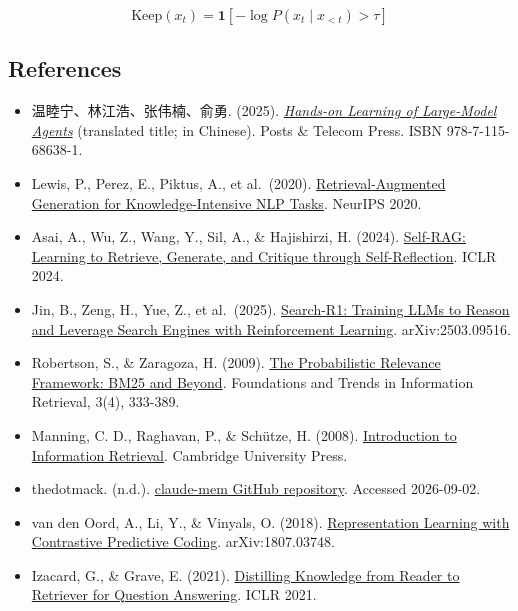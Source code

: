 \[
\mathrm{Keep}(x_t)=\mathbf{1}\!\left[-\log P\!\left(x_t\mid x_{<t}\right)>\tau\right]
\]

\FloatBarrier
{}
\hypertarget{references-125}{%
\subsection{References}\label{references-125}}

\vspace{0.25em}
\begin{itemize}
\tightlist
\item
  温睦宁、林江浩、张伟楠、俞勇. (2025). \href{https://haa.boyuai.com/}{\emph{Hands-on Learning of Large-Model Agents}} (translated title; in Chinese). Posts \& Telecom Press. ISBN 978-7-115-68638-1.
\item
  Lewis, P., Perez, E., Piktus, A., et al.~(2020). \href{https://proceedings.neurips.cc/paper/2020/hash/6b493230-Abstract.html}{Retrieval-Augmented Generation for Knowledge-Intensive NLP Tasks}. NeurIPS 2020.
\item
  Asai, A., Wu, Z., Wang, Y., Sil, A., \& Hajishirzi, H. (2024). \href{https://openreview.net/forum?id=hSyW5go0v8}{Self-RAG: Learning to Retrieve, Generate, and Critique through Self-Reflection}. ICLR 2024.
\item
  Jin, B., Zeng, H., Yue, Z., et al.~(2025). \href{https://arxiv.org/abs/2503.09516}{Search-R1: Training LLMs to Reason and Leverage Search Engines with Reinforcement Learning}. arXiv:2503.09516.
\item
  Robertson, S., \& Zaragoza, H. (2009). \href{https://doi.org/10.1561/1500000019}{The Probabilistic Relevance Framework: BM25 and Beyond}. Foundations and Trends in Information Retrieval, 3(4), 333-389.
\item
  Manning, C. D., Raghavan, P., \& Schütze, H. (2008). \href{https://nlp.stanford.edu/IR-book/}{Introduction to Information Retrieval}. Cambridge University Press.
\item
  thedotmack. (n.d.). \href{https://github.com/thedotmack/claude-mem}{claude-mem GitHub repository}. Accessed 2026-09-02.
\item
  van den Oord, A., Li, Y., \& Vinyals, O. (2018). \href{https://arxiv.org/abs/1807.03748}{Representation Learning with Contrastive Predictive Coding}. arXiv:1807.03748.
\item
  Izacard, G., \& Grave, E. (2021). \href{https://arxiv.org/abs/2012.04584}{Distilling Knowledge from Reader to Retriever for Question Answering}. ICLR 2021.

\end{itemize}
